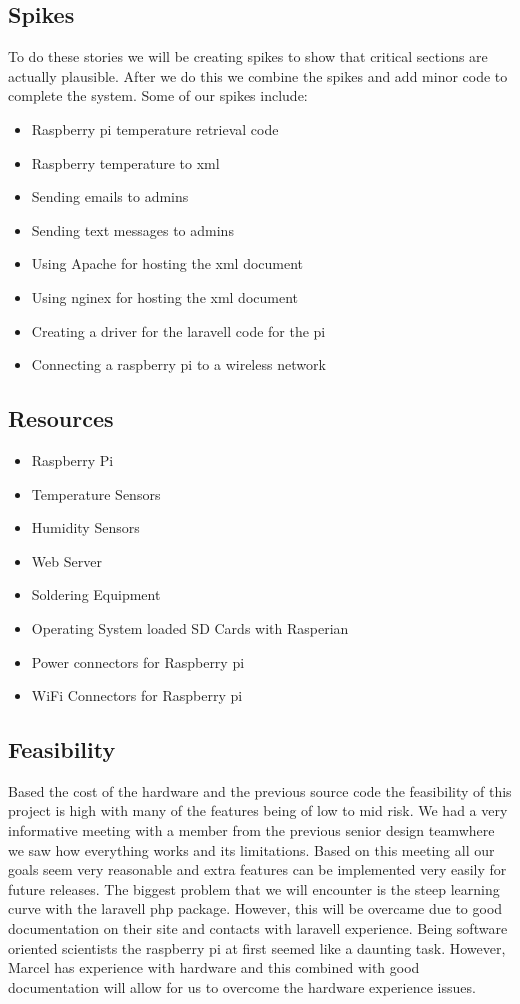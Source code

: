 \documentclass{report}
\begin{document}
\subsection*{Spikes}
To do these stories we will be creating spikes to show that critical sections are actually plausible. 
After we do this we combine the spikes and add minor code to complete the system.
Some of our spikes include:
\begin{itemize} 
\item Raspberry pi temperature retrieval code
\item Raspberry temperature to xml
\item Sending emails to admins
\item Sending text messages to admins
\item Using Apache for hosting the xml document
\item Using nginex for hosting the xml document
\item Creating a driver for the laravell code for the pi 
\item Connecting a raspberry pi to a wireless network
\end{itemize}
\newpage
\subsection*{Resources}
\begin{itemize}
\item Raspberry Pi
\item Temperature Sensors
\item Humidity Sensors
\item Web Server
\item Soldering Equipment
\item Operating System loaded SD Cards with Rasperian
\item Power connectors for Raspberry pi
\item WiFi Connectors for Raspberry pi
\end{itemize}
\newpage
\subsection*{Feasibility}
Based the cost of the hardware and the previous source code the feasibility of this project is high with many of the features being of low to mid risk. 
We had a very informative meeting with a member from the previous senior design teamwhere we saw how everything works and its limitations.
Based on this meeting all our goals seem very reasonable and extra features can be implemented very easily for future releases.
The biggest problem that we will encounter is the steep learning curve with the laravell php package.
However, this will be overcame due to good documentation on their site and contacts with laravell experience.
Being software oriented scientists the raspberry pi at first seemed like a daunting task. 
However, Marcel has experience with hardware and this combined with good documentation will allow for us to overcome the hardware experience issues.
\end{document}
